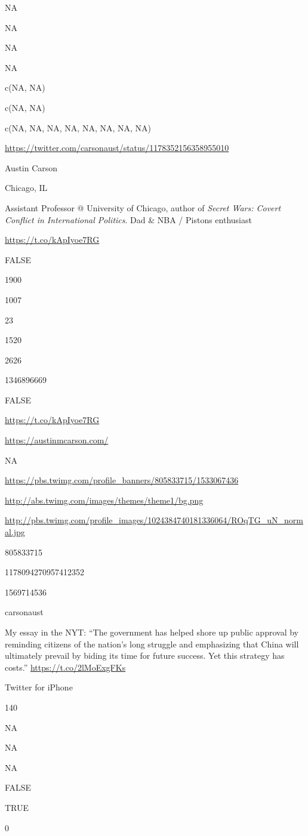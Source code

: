 \documentclass[]{book}
\begin{document}
NA

NA

NA

NA

c(NA, NA)

c(NA, NA)

c(NA, NA, NA, NA, NA, NA, NA, NA)

\url{https://twitter.com/carsonaust/status/1178352156358955010}

Austin Carson

Chicago, IL

Assistant Professor @ University of Chicago, author of \emph{Secret
Wars: Covert Conflict in International Politics}. Dad \& NBA / Pistons
enthusiast

\url{https://t.co/kApIyoe7RG}

FALSE

1900

1007

23

1520

2626

1346896669

FALSE

\url{https://t.co/kApIyoe7RG}

\url{https://austinmcarson.com/}

NA

\url{https://pbs.twimg.com/profile_banners/805833715/1533067436}

\url{http://abs.twimg.com/images/themes/theme1/bg.png}

\url{http://pbs.twimg.com/profile_images/1024384740181336064/ROqTG_uN_normal.jpg}

805833715

1178094270957412352

1569714536

carsonaust

My essay in the NYT: ``The government has helped shore up public
approval by reminding citizens of the nation's long struggle and
emphasizing that China will ultimately prevail by biding its time for
future success. Yet this strategy has costs.''
\url{https://t.co/2lMoExgFKs}

Twitter for iPhone

140

NA

NA

NA

FALSE

TRUE

0
\end{document}
